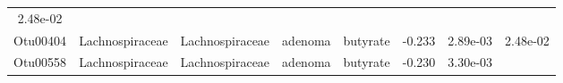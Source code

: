 \documentclass[11pt,]{article}
\begin{document}
\begin{longtable}[]{@{}cccccccc@{}}
\begin{minipage}[t]{0.08\columnwidth}
2.48e-02\strut
\end{minipage}\tabularnewline
\begin{minipage}[t]{0.08\columnwidth}\centering\strut
Otu00404\strut
\end{minipage} & \begin{minipage}[t]{0.15\columnwidth}\centering\strut
Lachnospiraceae\strut
\end{minipage} & \begin{minipage}[t]{0.15\columnwidth}\centering\strut
Lachnospiraceae\strut
\end{minipage} & \begin{minipage}[t]{0.08\columnwidth}\centering\strut
adenoma\strut
\end{minipage} & \begin{minipage}[t]{0.09\columnwidth}\centering\strut
butyrate\strut
\end{minipage} & \begin{minipage}[t]{0.07\columnwidth}\centering\strut
-0.233\strut
\end{minipage} & \begin{minipage}[t]{0.08\columnwidth}\centering\strut
2.89e-03\strut
\end{minipage} & \begin{minipage}[t]{0.08\columnwidth}\centering\strut
2.48e-02\strut
\end{minipage}\tabularnewline
\begin{minipage}[t]{0.08\columnwidth}\centering\strut
Otu00558\strut
\end{minipage} & \begin{minipage}[t]{0.15\columnwidth}\centering\strut
Lachnospiraceae\strut
\end{minipage} & \begin{minipage}[t]{0.15\columnwidth}\centering\strut
Lachnospiraceae\strut
\end{minipage} & \begin{minipage}[t]{0.08\columnwidth}\centering\strut
adenoma\strut
\end{minipage} & \begin{minipage}[t]{0.09\columnwidth}\centering\strut
butyrate\strut
\end{minipage} & \begin{minipage}[t]{0.07\columnwidth}\centering\strut
-0.230\strut
\end{minipage} & \begin{minipage}[t]{0.08\columnwidth}\centering\strut
3.30e-03\strut
\end{minipage} & \begin{minipage}[t]{0.08\columnwidth}\centering\strut

\end{minipage}
\end{longtable}
\end{document}
